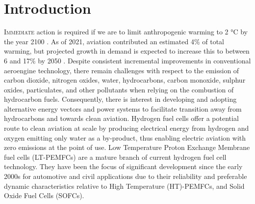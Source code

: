 \section{Introduction}

\lettrine{I}{mmediate} action is required if we are to limit anthropogenic warming to 2 °C by the year 2100 \cite{environmentEmissionsGapReport2024}.
As of 2021, aviation contributed an estimated 4\% of total warming, but projected growth in demand is expected to increase this to between 6 and 17\% by 2050 \cite{klowerQuantifyingAviationsContribution2021}.
Despite consistent incremental improvements in conventional aeroengine technology, there remain challenges with respect to the emission of carbon dioxide, nitrogen oxides, water, hydrocarbons, carbon monoxide, sulphur oxides, particulates, and other pollutants when relying on the combustion of hydrocarbon fuels.
Consequently, there is interest in developing and adopting alternative energy vectors and power systems to facilitate transition away from hydrocarbons and towards clean aviation.
Hydrogen fuel cells offer a potential route to clean aviation at scale by producing electrical energy from hydrogen and oxygen emitting only water as a by-product, thus enabling electric aviation with zero emissions at the point of use.
Low Temperature Proton Exchange Membrane fuel cells (LT-PEMFCs) are a mature branch of current hydrogen fuel cell technology. They have been the focus of significant development since the early 2000s for automotive and civil applications due to their reliability and preferable dynamic characteristics relative to High Temperature (HT)-PEMFCs, and Solid Oxide Fuel Cells (SOFCs).

